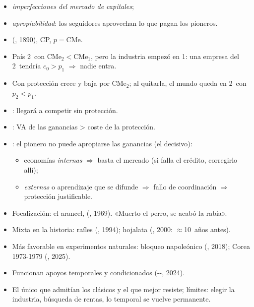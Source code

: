 \documentclass{article}
\begin{document}
\begin{columnas}
\begin{itemize}
\begin{itemize}
  \item \emph{imperfecciones del mercado de capitales};
  \item \emph{apropiabilidad}: los seguidores aprovechan lo que pagan los pioneros.
  \end{itemize}
\end{itemize}
\begin{itemize}
\item {} (, 1890), CP, $p=\mathrm{CMe}$.
\item País 2~con $\mathrm{CMe}_2<\mathrm{CMe}_1$, pero la industria empezó en 1: una empresa del 2~tendría $c_0>p_1$ $\Rightarrow$ nadie entra.
\item Con protección crece y baja por $\mathrm{CMe}_2$; al quitarla, el mundo queda en 2~con $p_2<p_1$.
\end{itemize}
\begin{itemize}
\item {}: llegará a competir sin protección.
\item {}: VA de las ganancias > coste de la protección.
\item {}: el pionero no puede apropiarse las ganancias (el decisivo):
  \begin{itemize}
  \item economías \emph{internas} $\Rightarrow$ basta el mercado (si falla el crédito, corregirlo allí);
  \item \emph{externas} o aprendizaje que se difunde $\Rightarrow$ fallo de coordinación $\Rightarrow$ protección justificable.
  \end{itemize}
\item Focalización: el arancel,  (, 1969). «Muerto el perro, se acabó la rabia».
\end{itemize}
\begin{itemize}
\item Mixta en la historia: raíles (, 1994); hojalata (, 2000: $\approx$10~años antes).
\item Más favorable en experimentos naturales: bloqueo napoleónico (, 2018); Corea 1973-1979 (, 2025).
\item Funcionan apoyos temporales y condicionados (--, 2024).
\item El único que admitían los clásicos y el que mejor resiste; límites: elegir la industria, búsqueda de rentas, lo temporal se vuelve permanente.
\end{itemize}


\end{columnas}
\end{document}
